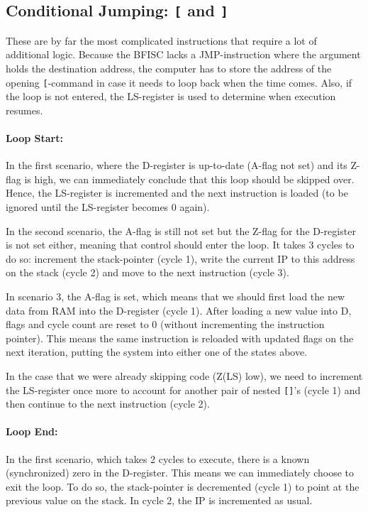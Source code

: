 \subsection{Conditional Jumping: \texttt{[} and \texttt{]}}
These are by far the most complicated instructions that require a lot of additional logic. Because the BFISC lacks a JMP-instruction where the argument holds the destination address, the computer has to store the address of the opening \texttt{[}-command in case it needs to loop back when the time comes. Also, if the loop is not entered, the LS-register is used to determine when execution resumes.

\paragraph{Loop Start:}  
In the first scenario, where the D-register is up-to-date (A-flag not set) and its Z-flag is high, we can immediately conclude that this loop should be skipped over. Hence, the LS-register is incremented and the next instruction is loaded (to be ignored until the LS-register becomes 0 again).

In the second scenario, the A-flag is still not set but the Z-flag for the D-register is not set either, meaning that control should enter the loop. It takes 3 cycles to do so: increment the stack-pointer (cycle 1), write the current IP to this address on the stack (cycle 2) and move to the next instruction (cycle 3).

In scenario 3, the A-flag is set, which means that we should first load the new data from RAM into the D-register (cycle 1). After loading a new value into D, flags and cycle count are reset to 0 (without incrementing the instruction pointer). This means the same instruction is reloaded with updated flags on the next iteration, putting the system into either one of the states above.

In the case that we were already skipping code (Z(LS) low), we need to increment the LS-register once more to account for another pair of nested \texttt{[]}'s (cycle 1) and then continue to the next instruction (cycle 2).

\paragraph{Loop End:}
In the first scenario, which takes 2 cycles to execute, there is a known (synchronized) zero in the D-register. This means we can immediately choose to exit the loop. To do so, the stack-pointer is decremented (cycle 1) to point at the previous value on the stack. In cycle 2, the IP is incremented as usual.

